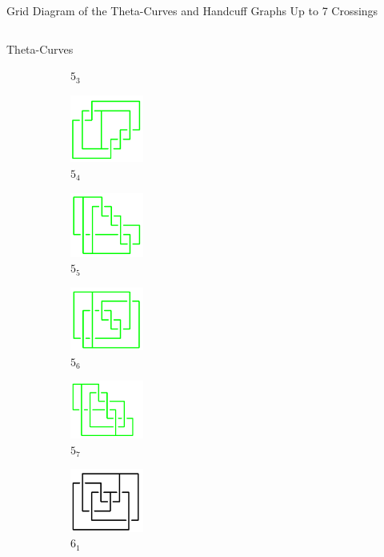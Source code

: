 \documentclass[final]{beamer}
\begin{document}
\begin{frame}[t]
\begin{alertblock}{Grid Diagram of the Theta-Curves and Handcuff Graphs Up to 7 Crossings}
\begin{columns}[t]
\begin{column}{0.6\textwidth}
\begin{alertblock}{Theta-Curves}
\begin{figure}
\begin{subfigure}{0.075\textwidth}
    \caption{$5_3$}
    \end{subfigure}
    \begin{subfigure}{0.075\textwidth}
    \includegraphics[width=2.4cm]{../Midterm_Poster/grid_diagram/theta_5_4.png}
    \caption{$5_4$} 
    \end{subfigure}
    \begin{subfigure}{0.075\textwidth}
    \includegraphics[width=2.4cm]{../Midterm_Poster/grid_diagram/theta_5_5.png}
    \caption{$5_5$} 
    \end{subfigure}
    \begin{subfigure}{0.075\textwidth}
    \includegraphics[width=2.4cm]{../Midterm_Poster/grid_diagram/theta_5_6.png}
    \caption{$5_6$} 
    \end{subfigure}
    \begin{subfigure}{0.075\textwidth}
    \includegraphics[width=2.4cm]{../Midterm_Poster/grid_diagram/theta_5_7.png}
    \caption{$5_7$} 
    \end{subfigure}
    \begin{subfigure}{0.075\textwidth}
    \includegraphics[width=2.4cm]{../Midterm_Poster/grid_diagram/theta_6_1.png}
    \caption{$6_1$} 
    \end{subfigure}
    \begin{subfigure}{0.075\textwidth}

\end{subfigure}
\end{figure}
\end{alertblock}
\end{column}
\end{columns}
\end{alertblock}
\end{frame}
\end{document}
